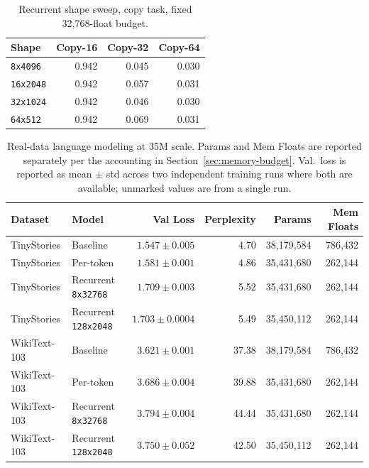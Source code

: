 \documentclass[10pt]{article} %
\begin{document}
\begin{table}[h]
\centering
\caption{Recurrent shape sweep, copy task, fixed 32,768-float budget.}
\label{tab:shapesweep}
\begin{tabular}{lrrr}
\toprule
Shape & Copy-16 & Copy-32 & Copy-64 \\
\midrule
\texttt{8x4096}  & 0.942 & 0.045 & 0.030 \\
\texttt{16x2048} & 0.942 & 0.057 & 0.031 \\
\texttt{32x1024} & 0.942 & 0.046 & 0.030 \\
\texttt{64x512}  & 0.942 & 0.069 & 0.031 \\
\bottomrule
\end{tabular}
\end{table}

\begin{table}[h]
\centering
\caption{Real-data language modeling at 35M scale. Params and Mem Floats
are reported separately per the accounting in Section~\ref{sec:memory-budget}.
Val.\ loss is reported as mean $\pm$ std across two independent training
runs where both are available; unmarked values are from a single run.}
\label{tab:realdata}
\begin{tabular}{llrrrr}
\toprule
Dataset & Model & Val Loss & Perplexity & Params & Mem Floats \\
\midrule
TinyStories  & Baseline                     & $1.547 \pm 0.005$ & 4.70  & 38{,}179{,}584 & 786{,}432 \\
TinyStories  & Per-token                    & $1.581 \pm 0.001$ & 4.86  & 35{,}431{,}680 & 262{,}144 \\
TinyStories  & Recurrent \texttt{8x32768}   & $1.709 \pm 0.003$   & 5.52  & 35{,}431{,}680 & 262{,}144 \\
TinyStories  & Recurrent \texttt{128x2048}  & $1.703 \pm 0.0004$ & 5.49  & 35{,}450{,}112 & 262{,}144 \\
\addlinespace
WikiText-103 & Baseline                     & $3.621 \pm 0.001$  & 37.38 & 38{,}179{,}584 & 786{,}432 \\
WikiText-103 & Per-token                    & $3.686 \pm 0.004$  & 39.88 & 35{,}431{,}680 & 262{,}144 \\
WikiText-103 & Recurrent \texttt{8x32768}   & $3.794 \pm 0.004$   & 44.44 & 35{,}431{,}680 & 262{,}144 \\
WikiText-103 & Recurrent \texttt{128x2048}  & $3.750 \pm 0.052$  & 42.50 & 35{,}450{,}112 & 262{,}144 \\
\bottomrule
\end{tabular}
\end{table}
\end{document}
